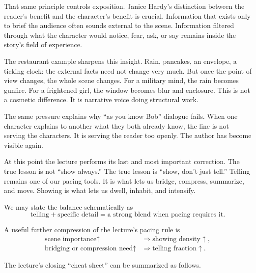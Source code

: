 That same principle controls exposition. Janice Hardy's distinction between the reader's benefit and the character's benefit is crucial. Information that exists only to brief the audience often sounds external to the scene. Information filtered through what the character would notice, fear, ask, or say remains inside the story's field of experience.

The restaurant example sharpens this insight. Rain, pancakes, an envelope, a ticking clock: the external facts need not change very much. But once the point of view changes, the whole scene changes. For a military mind, the rain becomes gunfire. For a frightened girl, the window becomes blur and enclosure. This is not a cosmetic difference. It is narrative voice doing structural work.

The same pressure explains why ``as you know Bob'' dialogue fails. When one character explains to another what they both already know, the line is not serving the characters. It is serving the reader too openly. The author has become visible again.

At this point the lecture performs its last and most important correction. The true lesson is not ``show always.'' The true lesson is ``show, don't just tell.'' Telling remains one of our pacing tools. It is what lets us bridge, compress, summarize, and move. Showing is what lets us dwell, inhabit, and intensify.

We may state the balance schematically as
\begin{equation}
\text{telling} + \text{specific detail} = \text{a strong blend when pacing requires it}.
\end{equation}

A useful further compression of the lecture's pacing rule is
\begin{align}
\text{scene importance} \uparrow &\Rightarrow \text{showing density} \uparrow,\\
\text{bridging or compression need} \uparrow &\Rightarrow \text{telling fraction} \uparrow.
\end{align}

The lecture's closing ``cheat sheet'' can be summarized as follows.

